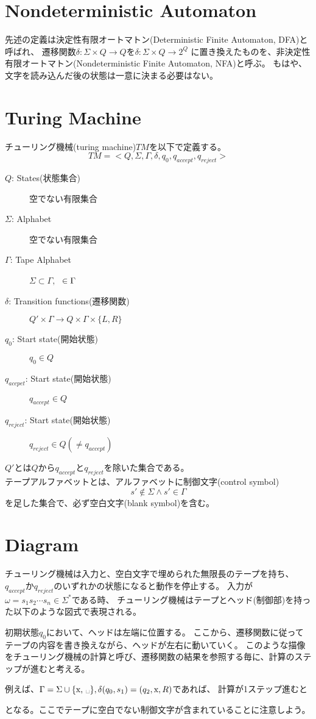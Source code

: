 \documentclass[b5paper,fleqn]{ltjsarticle}
\begin{document}
\section{Nondeterministic Automaton}
先述の定義は決定性有限オートマトン(Deterministic Finite Automaton, DFA)と呼ばれ、
遷移関数$\delta:\Sigma\times Q\rightarrow Q$を$\delta:\Sigma\times Q\rightarrow 2^Q$
に置き換えたものを、非決定性有限オートマトン(Nondeterministic Finite Automaton, NFA)と呼ぶ。
もはや、文字を読み込んだ後の状態は一意に決まる必要はない。

\newpage
\section{Turing Machine}
チューリング機械(turing machine)$TM$を以下で定義する。
\[TM=<Q,\Sigma,\Gamma,\delta,q_0,q_{accept},q_{reject}>\]
\begin{description}
\item[$Q$: States(状態集合)] 空でない有限集合
\item[$\Sigma$: Alphabet] 空でない有限集合
\item[$\Gamma$: Tape Alphabet] $\Sigma\subset\Gamma,$ \textvisiblespace$\hskip3pt\in\Gamma$
\item[$\delta$: Transition functions(遷移関数)] $Q'\times\Gamma\rightarrow Q\times\Gamma\times\{L,R\}$
\item[$q_0$: Start state(開始状態)] $q_0\in Q$
\item[$q_{accpet}$: Start state(開始状態)] $q_{accept}\in Q$
\item[$q_{reject}$: Start state(開始状態)] $q_{reject}\in Q (\neq q_{accept})$
\end{description}
$Q'$とは$Q$から$q_{accept}$と$q_{reject}$を除いた集合である。\\
テープアルファベットとは、アルファベットに制御文字(control symbol)
\[s'\notin\Sigma\land s'\in\Gamma\]
を足した集合で、必ず空白文字(blank symbol)\textvisiblespace を含む。
\section{Diagram}
チューリング機械は入力と、空白文字で埋められた無限長のテープを持ち、
$q_{accept}$か$q_{reject}$のいずれかの状態になると動作を停止する。
入力が$\omega=s_1s_2\cdots s_n\in\Sigma^*$である時、
チューリング機械はテープとヘッド(制御部)を持った以下のような図式で表現される。

初期状態$q_0$において、ヘッドは左端に位置する。
ここから、遷移関数に従ってテープの内容を書き換えながら、ヘッドが左右に動いていく。
このような描像をチューリング機械の計算と呼び、遷移関数の結果を参照する毎に、計算のステップが進むと考える。\par
例えば、$\Gamma=\Sigma\cup\{\text{x, \textvisiblespace}\}, \delta(q_0,s_1)=(q_2,\text{x},R)$であれば、
計算が1ステップ進むと

となる。ここでテープに空白でない制御文字が含まれていることに注意しよう。
\end{document}
